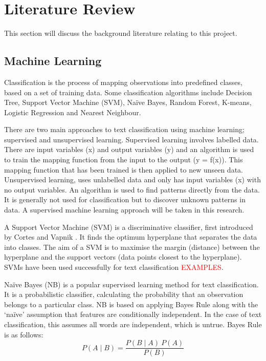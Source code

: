 \chapter{Literature Review}

This section will discuss the background literature relating to this project.

\section{Machine Learning}

Classification is the process of mapping observations into predefined classes, based on a set of training data. Some classification algorithms include Decision Tree, Support Vector Machine (SVM), Naïve Bayes, Random Forest, K-means, Logistic Regression and Nearest Neighbour.

There are two main approaches to text classification using machine learning; supervised and unsupervised learning. Supervised learning involves labelled data. There are input variables (x) and output variables (y) and an algorithm is used to train the mapping function from the input to the output (y = f(x)). This mapping function that has been trained is then applied to new unseen data. Unsupervised learning, uses unlabelled data and only has input variables (x) with no output variables. An algorithm is used to find patterns directly from the data. It is generally not used for classification but to discover unknown patterns in data. A supervised machine learning approach will be taken in this research.

A Support Vector Machine (SVM) is a discriminative classifier, first introduced by Cortes and Vapnik \cite{Vapnik1995,Vapnik21995}. It finds the optimum hyperplane that separates the data into classes. The aim of a SVM is to maximise the margin (distance) between the hyperplane and the support vectors (data points closest to the hyperplane). SVMs have been used successfully for text classification \textcolor{red}{EXAMPLES}.

Naïve Bayes (NB) is a popular supervised learning method for text classification. It is a probabilistic classifier, calculating the probability that an observation belongs to a particular class. NB is based on applying Bayes Rule along with the ‘naïve’ assumption that features are conditionally independent. In the case of text classification, this assumes all words are independent, which is untrue. Bayes Rule is as follows:  \[P(A\mid B)=\frac{P(B\mid A)\:P(A)}{P(B)}\] 

